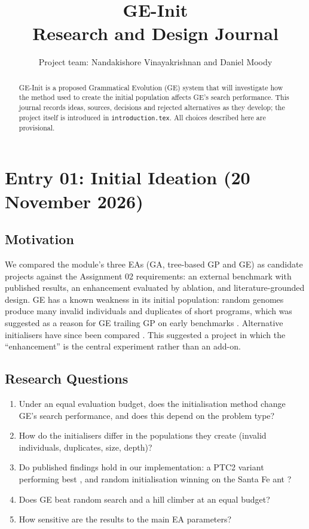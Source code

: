 \documentclass[11pt,a4paper]{article}
\title{\textbf{GE-Init}\\Research and Design Journal}
\author{Project team: Nandakishore Vinayakrishnan and Daniel Moody}
\begin{document}
    \maketitle
    \begin{abstract}
        GE-Init is a proposed Grammatical Evolution (GE) system that will investigate how the method used to create the initial population affects GE's search performance.
        This journal records ideas, sources, decisions and rejected alternatives as they develop; the project itself is introduced in \texttt{introduction.tex}.
        All choices described here are provisional.
    \end{abstract}


    \section{Entry 01: Initial Ideation (20 November 2026)}\label{sec:entry-01}

    \subsection{Motivation}\label{subsec:motivation}
    We compared the module's three EAs (GA, tree-based GP and GE) as candidate projects against the Assignment 02 requirements: an external benchmark with published results, an enhancement evaluated by ablation, and literature-grounded design.
    GE \citep{ryan1998} has a known weakness in its initial population: random genomes produce many invalid individuals and duplicates of short programs, which was suggested as a reason for GE trailing GP on early benchmarks \citep{oneill2001}.
    Alternative initialisers have since been compared \citep{harper2010,nicolau2017}.
    This suggested a project in which the ``enhancement'' is the central experiment rather than an add-on.

    \subsection{Research Questions}\label{subsec:research-questions}
    \begin{enumerate}[label=\textbf{RQ\arabic*:}]
        \item Under an equal evaluation budget, does the initialisation method change GE's search performance, and does this depend on the problem type?
        \item How do the initialisers differ in the populations they create (invalid individuals, duplicates, size, depth)?
        \item Do published findings hold in our implementation: a PTC2 variant performing best \citep{nicolau2017}, and random initialisation winning on the Santa Fe ant \citep{ryan2003chorus}?
        \item Does GE beat random search and a hill climber at an equal budget?
        \item How sensitive are the results to the main EA parameters?
    \end{enumerate}
\end{document}
